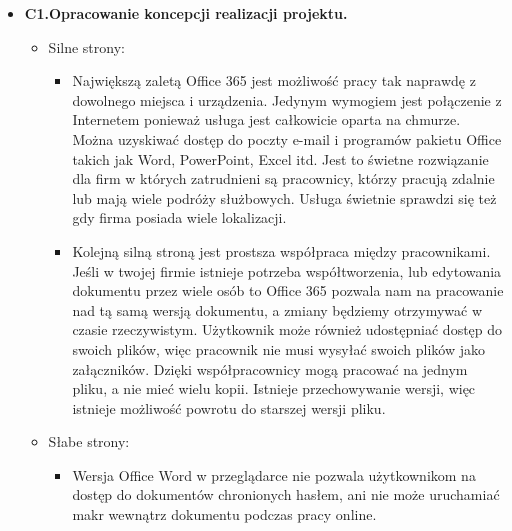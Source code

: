 \documentclass[12pt]{article}
\renewcommand{\_}{\kern-1.5pt\textunderscore\kern-1.5pt}
\begin{document}
\begin{itemize}
	\item \textbf{C1.Opracowanie koncepcji realizacji projektu.}\par

\begin{itemize}
	\item Silne strony:\par

\begin{itemize}
	\item Największą zaletą Office 365 jest możliwość pracy tak naprawdę z dowolnego miejsca i urządzenia. Jedynym wymogiem jest połączenie z Internetem ponieważ usługa jest całkowicie oparta na chmurze. Można uzyskiwać dostęp do poczty e-mail i programów pakietu Office takich jak Word, PowerPoint, Excel itd. Jest to świetne rozwiązanie dla firm w których zatrudnieni są pracownicy, którzy pracują zdalnie lub mają wiele podróży służbowych. Usługa świetnie sprawdzi się też gdy firma posiada wiele lokalizacji.\par

	\item Kolejną silną stroną jest prostsza współpraca między pracownikami. Jeśli w twojej firmie istnieje potrzeba współtworzenia, lub edytowania dokumentu przez wiele osób to Office 365 pozwala nam na pracowanie nad tą samą wersją dokumentu, a zmiany będziemy otrzymywać w czasie rzeczywistym. Użytkownik może również udostępniać dostęp do swoich plików, więc pracownik nie musi wysyłać swoich plików jako załączników. Dzięki współpracownicy mogą pracować na jednym pliku, a nie mieć wielu kopii. Istnieje przechowywanie wersji, więc istnieje możliwość powrotu do starszej wersji pliku.\par


\end{itemize}
	\item Słabe strony:\par

\begin{itemize}
	\item Wersja Office Word w przeglądarce nie pozwala użytkownikom na dostęp do dokumentów chronionych hasłem, ani nie może uruchamiać makr wewnątrz dokumentu podczas pracy online.\par



\end{itemize}
\end{itemize}
\end{itemize}
\end{document}
